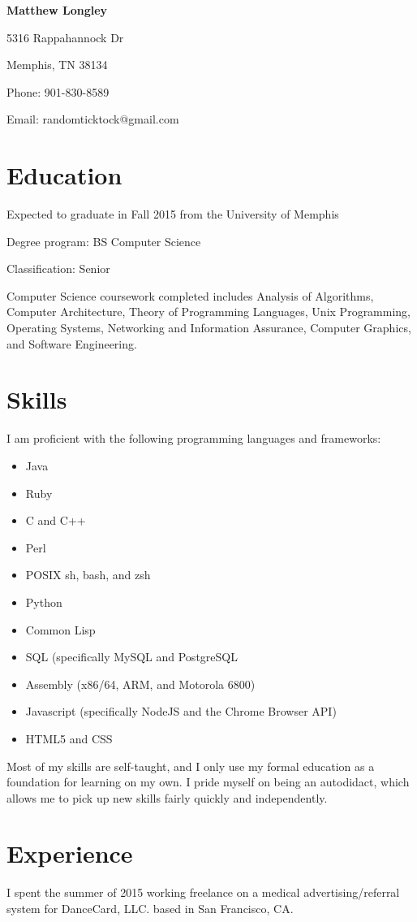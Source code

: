 \documentclass{article}
\begin{document}
\begin{singlespace}
\begin{center}
  \textbf{Matthew Longley}
  
  5316 Rappahannock Dr
  
  Memphis, TN 38134
  
  Phone: 901-830-8589
  
  Email: randomticktock@gmail.com
\end{center}
\begin{flushleft}
  \section*{Education}
  Expected to graduate in Fall 2015 from the University of Memphis

  Degree program: BS Computer Science

  Classification: Senior

  Computer Science coursework completed includes Analysis of Algorithms, Computer Architecture, Theory of Programming Languages, Unix Programming, Operating Systems, Networking and Information Assurance, Computer Graphics, and Software Engineering.
  \section*{Skills}
  I am proficient with the following programming languages and frameworks:
  \begin{itemize}
  \item Java
  \item Ruby
  \item C and C++
  \item Perl
  \item POSIX sh, bash, and zsh
  \item Python
  \item Common Lisp
  \item SQL (specifically MySQL and PostgreSQL
  \item Assembly (x86/64, ARM, and Motorola 6800)
  \item Javascript (specifically NodeJS and the Chrome Browser API)
  \item HTML5 and CSS
  \end{itemize}
  Most of my skills are self-taught, and I only use my formal education as a foundation for learning on my own. I pride myself on being an autodidact, which allows me to pick up new skills fairly quickly and independently.
  \section*{Experience}
  I spent the summer of 2015 working freelance on a medical advertising/referral system for DanceCard, LLC. based in San Francisco, CA.
\end{flushleft}
\end{singlespace}
\end{document}
